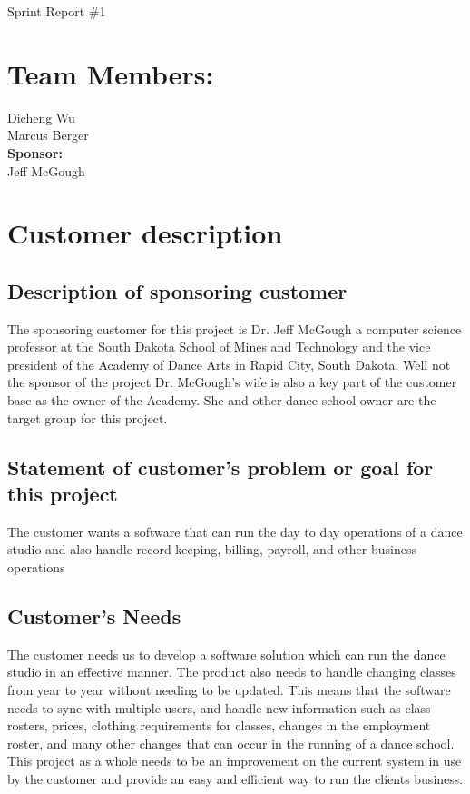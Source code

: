 \documentclass[11pt]{book}
\begin{document}
\fontsize{16}{16}\selectfont Sprint Report \#1


\section{Team Members:}
Dicheng Wu
\\Marcus Berger\\
\textbf{Sponsor:}
\\Jeff McGough
\\

\section{Customer description}

\subsection{Description of sponsoring customer}
The sponsoring customer for this project is Dr. Jeff McGough a computer science professor at the South Dakota School of Mines and Technology and the vice president of the Academy of Dance Arts in Rapid City, South Dakota. Well not the sponsor of the project Dr. McGough's wife is also a key part of the customer base as the owner of the Academy. She and other dance school owner are the target group for this project. 

\subsection{Statement of customer's problem or goal for this project}
The customer wants a software that can run the day to day operations of a dance studio and also handle record keeping, billing, payroll, and other business operations
 
\subsection{Customer's Needs}
The customer needs us to develop a software solution which can run the dance studio in an effective manner. The product also needs to handle changing classes from year to year without needing to be updated. This means that the software needs to sync with multiple users, and handle new information such as class rosters, prices, clothing requirements for classes, changes in the employment roster, and many other changes that can occur in the running of a dance school.\\
This project as a whole needs to be an improvement on the current system in use by the customer and provide an easy and efficient way to run the clients business. 
\end{document}
